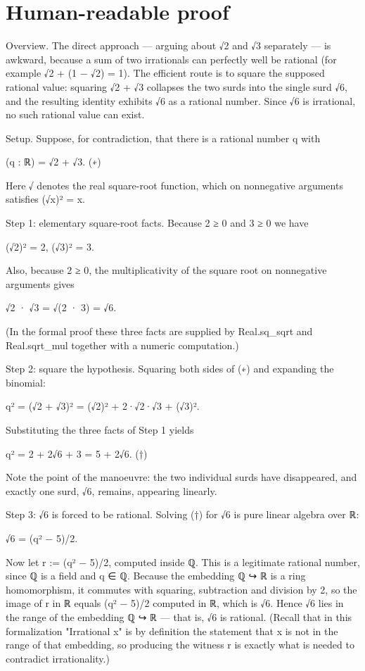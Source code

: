 \documentclass[11pt]{article}
\begin{document}
\section*{Human-readable proof}
Overview. The direct approach — arguing about √2 and √3 separately — is awkward, because a sum of two irrationals can perfectly well be rational (for example √2 + (1 − √2) = 1). The efficient route is to square the supposed rational value: squaring √2 + √3 collapses the two surds into the single surd √6, and the resulting identity exhibits √6 as a rational number. Since √6 is irrational, no such rational value can exist.

Setup. Suppose, for contradiction, that there is a rational number q with

    (q : ℝ) = √2 + √3.                                            (∗)

Here √ denotes the real square-root function, which on nonnegative arguments satisfies (√x)² = x.

Step 1: elementary square-root facts. Because 2 ≥ 0 and 3 ≥ 0 we have

    (√2)² = 2,    (√3)² = 3.

Also, because 2 ≥ 0, the multiplicativity of the square root on nonnegative arguments gives

    √2 · √3 = √(2 · 3) = √6.

(In the formal proof these three facts are supplied by Real.sq\_sqrt and Real.sqrt\_mul together with a numeric computation.)

Step 2: square the hypothesis. Squaring both sides of (∗) and expanding the binomial:

    q² = (√2 + √3)² = (√2)² + 2·√2·√3 + (√3)².

Substituting the three facts of Step 1 yields

    q² = 2 + 2√6 + 3 = 5 + 2√6.                                   (†)

Note the point of the manoeuvre: the two individual surds have disappeared, and exactly one surd, √6, remains, appearing linearly.

Step 3: √6 is forced to be rational. Solving (†) for √6 is pure linear algebra over ℝ:

    √6 = (q² − 5)/2.

Now let r := (q² − 5)/2, computed inside ℚ. This is a legitimate rational number, since ℚ is a field and q ∈ ℚ. Because the embedding ℚ ↪ ℝ is a ring homomorphism, it commutes with squaring, subtraction and division by 2, so the image of r in ℝ equals (q² − 5)/2 computed in ℝ, which is √6. Hence √6 lies in the range of the embedding ℚ ↪ ℝ — that is, √6 is rational. (Recall that in this formalization "Irrational x" is by definition the statement that x is not in the range of that embedding, so producing the witness r is exactly what is needed to contradict irrationality.)
\end{document}
